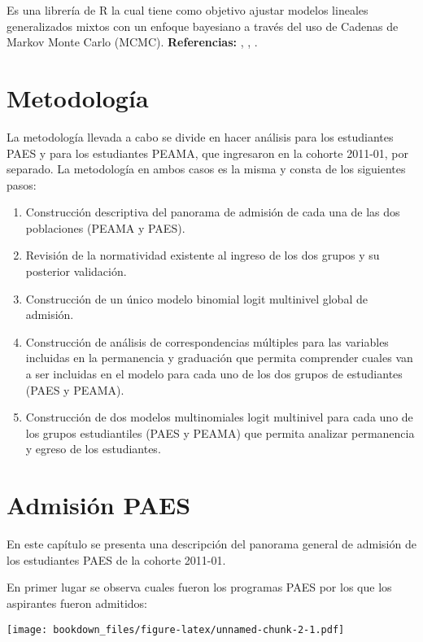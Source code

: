 \documentclass[]{article}
\providecommand{\tightlist}{%
  \setlength{\itemsep}{0pt}\setlength{\parskip}{0pt}}
\theoremstyle{definition}
\theoremstyle{definition}
\theoremstyle{definition}
\theoremstyle{remark}
\begin{document}
Es una librería de R la cual tiene como objetivo ajustar modelos
lineales generalizados mixtos con un enfoque bayesiano a través del uso
de Cadenas de Markov Monte Carlo (MCMC). \textbf{Referencias:}
\citep{MCMCglmm}, \citep{HadfieldBook}, \citep{HadfieldCourseNotes}.

\section{Metodología}\label{metodologuxeda}

La metodología llevada a cabo se divide en hacer análisis para los
estudiantes PAES y para los estudiantes PEAMA, que ingresaron en la
cohorte 2011-01, por separado. La metodología en ambos casos es la misma
y consta de los siguientes pasos:

\begin{enumerate}
\def\labelenumi{\arabic{enumi}.}
\tightlist
\item
  Construcción descriptiva del panorama de admisión de cada una de las
  dos poblaciones (PEAMA y PAES).
\item
  Revisión de la normatividad existente al ingreso de los dos grupos y
  su posterior validación.
\item
  Construcción de un único modelo binomial logit multinivel global de
  admisión.
\item
  Construcción de análisis de correspondencias múltiples para las
  variables incluidas en la permanencia y graduación que permita
  comprender cuales van a ser incluidas en el modelo para cada uno de
  los dos grupos de estudiantes (PAES y PEAMA).
\item
  Construcción de dos modelos multinomiales logit multinivel para cada
  uno de los grupos estudiantiles (PAES y PEAMA) que permita analizar
  permanencia y egreso de los estudiantes.
\end{enumerate}

\section{Admisión PAES}\label{admision-paes}

En este capítulo se presenta una descripción del panorama general de
admisión de los estudiantes PAES de la cohorte 2011-01.

En primer lugar se observa cuales fueron los programas PAES por los que
los aspirantes fueron admitidos:

\texttt{[image: bookdown\_files/figure-latex/unnamed-chunk-2-1.pdf]}
\end{document}
